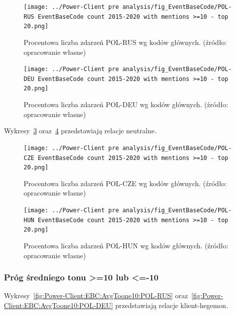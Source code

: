 \documentclass[11pt]{report}
\begin{document}
    \begin{figure}[!htp]
        \centering
        \texttt{[image: ../Power-Client pre analysis/fig\_EventBaseCode/POL-RUS EventBaseCode count 2015-2020 with mentions >=10 - top 20.png]}
        \caption{Procentowa liczba zdarzeń POL-RUS wg kodów głównych. (źródło: opracowanie własne)}
        \label{fig:Power-Client:EBC:Mentions10:POL-RUS}
    \end{figure}

    \begin{figure}[!htp]
        \centering
        \texttt{[image: ../Power-Client pre analysis/fig\_EventBaseCode/POL-DEU EventBaseCode count 2015-2020 with mentions >=10 - top 20.png]}
        \caption{Procentowa liczba zdarzeń POL-DEU wg kodów głównych. (źródło: opracowanie własne)}
        \label{fig:Power-Client:EBC:Mentions10:POL-DEU}
    \end{figure}

    Wykresy~\ref{fig:Power-Client:EBC:Mentions10:POL-CZE} oraz~\ref{fig:Power-Client:EBC:Mentions10:POL-HUN} przedstawiają relacje neutralne.

    \begin{figure}[!htp]
        \centering
        \texttt{[image: ../Power-Client pre analysis/fig\_EventBaseCode/POL-CZE EventBaseCode count 2015-2020 with mentions >=10 - top 20.png]}
        \caption{Procentowa liczba zdarzeń POL-CZE wg kodów głównych. (źródło: opracowanie własne)}
        \label{fig:Power-Client:EBC:Mentions10:POL-CZE}
    \end{figure}

    \begin{figure}[!htp]
        \centering
        \texttt{[image: ../Power-Client pre analysis/fig\_EventBaseCode/POL-HUN EventBaseCode count 2015-2020 with mentions >=10 - top 20.png]}
        \caption{Procentowa liczba zdarzeń POL-HUN wg kodów głównych. (źródło: opracowanie własne)}
        \label{fig:Power-Client:EBC:Mentions10:POL-HUN}
    \end{figure}

    \subsubsection{Próg średniego tonu >=10 lub <=-10}\label{subsubsec:ebc:próg-średniego-tonu->=10-lub-<=-10}

    Wykresy~\ref{fig:Power-Client:EBC:AvgToone10:POL-RUS} oraz~\ref{fig:Power-Client:EBC:AvgToone10:POL-DEU} przedstawiają relacje klient-hegemon.
\end{document}
